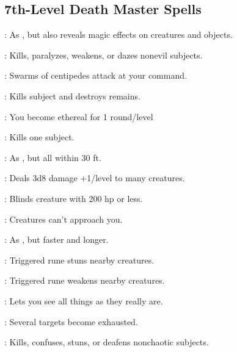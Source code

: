 \begin{multicols}{2}
\subsection{7th-Level Death Master Spells}
\begin{description*}
\item[\linkspell{Arcane Sight, Greater}:] As , but also reveals magic effects on creatures and objects.
\item[\linkspell{Blasphemy}:] Kills, paralyzes, weakens, or dazes nonevil subjects.
\item[\linkspell{Creeping Doom}:] Swarms of centipedes attack at your command.
\item[\linkspell{Destruction}:] Kills subject and destroys remains.
\item[\linkspell{Ethereal Jaunt}:] You become ethereal for 1 round/level
\item[\linkspell{Finger of Death}:] Kills one subject.
\item[\linkspell{Hold Person, Mass}:] As , but all within 30 ft.
\item[\linkspell{Inflict Serious Wounds, Mass}:] Deals 3d8 damage +1/level to many creatures.
\item[\linkspell{Power Word Blind}:] Blinds creature with 200 hp or less.
\item[\linkspell{Repulsion}:] Creatures can't approach you.
\item[\linkspell{Scrying, Greater}:] As , but faster and longer.
\item[\linkspell{Symbol of Stunning}:] Triggered rune stuns nearby creatures.
\item[\linkspell{Symbol of Weakness}:] Triggered rune weakens nearby creatures.
\item[\linkspell{True Seeing}:] Lets you see all things as they really are.
\item[\linkspell{Waves of Exhaustion}:] Several targets become exhausted.
\item[\linkspell{Word of Chaos}:] Kills, confuses, stuns, or deafens nonchaotic subjects.
\end{description*}


\end{multicols}
